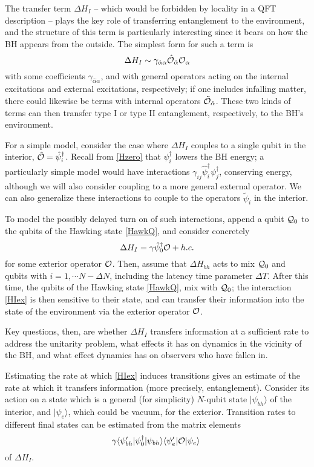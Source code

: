 \documentclass[11pt]{article}
\numberwithin{equation}{section}
\newcommand{\calo}{{\cal O}}
\newcommand{\calq}{{\cal Q}}
\newcommand{\beq}{\begin{equation}}
\newcommand{\eeq}{\end{equation}}
\begin{document}
The transfer term $\Delta H_I$ -- which would be forbidden by locality in a QFT description -- plays the key role of transferring entanglement to the environment, and the structure of this term is particularly interesting since it bears on how the BH appears from the outside.  The simplest form for such a term is
\beq
\Delta H_I \sim \gamma_{\hat \alpha\alpha}  \hat \calo_{\hat \alpha} \calo_\alpha
\eeq
with some coefficients $\gamma_{\hat \alpha\alpha}$, and with general operators acting on the internal excitations and external excitations, respectively; if one includes infalling matter, there could likewise be terms with internal operators $\tilde\calo_{\tilde \alpha}$.  These two kinds of terms can then transfer type I or type II entanglement, respectively, to the BH's environment.

For a  simple model, consider the case where $\Delta H_I$ couples to a single qubit in the interior, $\hat \calo = \hat \psi_i^\dagger$.  Recall from \eqref{Hzero} that $\psi_i^\dagger$ lowers the BH energy; a particularly simple model would have interactions $\gamma_{ij} \hat \psi_i^\dagger \psi_j^\dagger$, conserving energy, although we will also consider coupling to a more general external operator.  We can also generalize these interactions to couple to the operators $\tilde \psi_i$ in the interior.  

To model the possibly delayed turn on of such interactions, append a qubit $\calq_0$ to the qubits of the Hawking state \eqref{HawkQ}, and consider concretely  
\beq\label{HIex}
\Delta H_I = \gamma \hat \psi_0^\dagger \calo + h.c.
\eeq
for some exterior operator $\calo$.  Then, assume that $\Delta H_{bh}$ acts to mix $\calq_0$ and  qubits with $i=1,\cdots N-\Delta N$, including the latency time  parameter $\Delta T$.  
After this time, the qubits of the Hawking state \eqref{HawkQ}, mix with $\calq_0$; the interaction \eqref{HIex}  is then sensitive to their state, and can transfer their information into the state of the environment via the exterior operator $\calo$.

Key questions, then, are whether $\Delta H_I$ transfers information at a sufficient rate to address the unitarity problem, what effects it has on dynamics in the vicinity of the BH, and what effect dynamics  has on observers who have fallen in.

Estimating the rate at which \eqref{HIex} induces transitions gives an estimate of the rate at which it transfers information (more precisely, entanglement)\cite{NVU,GiRo}.  Consider its action on a state which is a general (for simplicity) $N$-qubit state $|\psi_{bh}\rangle$ of the interior, and $|\psi_e\rangle$, which could be vacuum, for the exterior.  Transition rates to different final states can be estimated from the matrix elements
\beq\label{matel}
\gamma  \langle \psi_{bh}'| \psi_0^\dagger |\psi_{bh}\rangle    \langle\psi_e'|   \calo |\psi_e\rangle\ 
\eeq
of $\Delta H_I$.
\end{document}
